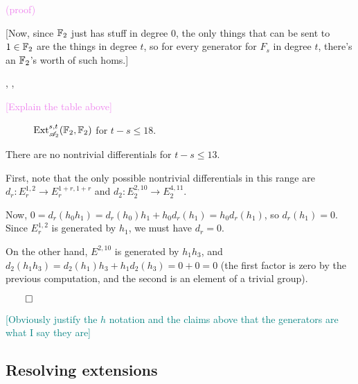 \documentclass{MetricNotes2023}
\def\bb{\ensuremath\mathbb}
\def\A{\ensuremath{\mathscr{A}_2}}
\DeclareMathOperator{\Ext}{Ext}
\def\done{\begin{flushright}\vspace{-4.35ex}\(\qed\)\end{flushright}}
\def\textcolour{\textcolor}
\begin{document}
\textcolour{violet}{(proof)}

[Now, since \(\bb{F}_2\) just has stuff in degree 0, the only things that can be sent to \(1 \in \bb{F}_2\) are the things in degree \(t\), so for every generator for \(F_s\) in degree \(t\), there's an \(\bb{F}_2\)'s worth of such homs.]

\autocite{ass}, \autocite{hatcher5}, \autocite{rognes2}



\textcolour{violet}{[Explain the table above]}


\begin{figure}[H]\label{1304251243}
\centering

\caption[\(\Ext_{\A}^{s,t}(\bb{F}_2, \bb{F}_2)\) for \(t-s\leq 18\).]{\(\Ext_{\A}^{s,t}(\bb{F}_2, \bb{F}_2)\) for \(t-s\leq 18\).\protect\footnotemark}
\end{figure}

\begin{lemma}
There are no nontrivial differentials for \(t-s\leq 13\). 
\end{lemma}

\begin{ourproof}
First, note that the only possible nontrivial differentials in this range are \(d_r : E_r^{1,2} \to E_r^{1+r, 1+r}\) and \(d_2 : E_2^{2, 10} \to E_2^{4, 11}\). 

Now, \(0=d_r(h_0h_1)=d_r(h_0)h_1 + h_0d_r(h_1)=h_0d_r(h_1)\), so \(d_r(h_1)=0\). Since \(E_r^{1, 2}\) is generated by \(h_1\), we must have \(d_r=0\). 

On the other hand, \(E^{2, 10}\) is generated by \(h_1h_3\), and \(d_2(h_1h_3)=d_2(h_1)h_3+h_1d_2(h_3)=0+0=0\) (the first factor is zero by the previous computation, and the second is an element of a trivial group). \done
\end{ourproof}

\textcolour{teal}{[Obviously justify the \(h\) notation and the claims above that the generators are what I say they are]}

\subsection{Resolving extensions}
\end{document}
